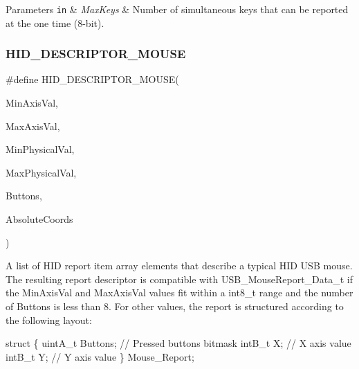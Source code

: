 \begin{DoxyParams}[1]{Parameters}
\mbox{\tt in}  & {\em Max\+Keys} & Number of simultaneous keys that can be reported at the one time (8-\/bit). \\
\hline
\end{DoxyParams}
\mbox{\label{group__Group__USBClassHIDCommon_ga9094a4f76840f1ef8d688cd729935d47}} 
\subsubsection{\texorpdfstring{H\+I\+D\+\_\+\+D\+E\+S\+C\+R\+I\+P\+T\+O\+R\+\_\+\+M\+O\+U\+SE}{HID\_DESCRIPTOR\_MOUSE}}
{\footnotesize\ttfamily \#define H\+I\+D\+\_\+\+D\+E\+S\+C\+R\+I\+P\+T\+O\+R\+\_\+\+M\+O\+U\+SE(\begin{DoxyParamCaption}\item[{}]{Min\+Axis\+Val,  }\item[{}]{Max\+Axis\+Val,  }\item[{}]{Min\+Physical\+Val,  }\item[{}]{Max\+Physical\+Val,  }\item[{}]{Buttons,  }\item[{}]{Absolute\+Coords }\end{DoxyParamCaption})}

A list of H\+ID report item array elements that describe a typical H\+ID U\+SB mouse. The resulting report descriptor is compatible with U\+S\+B\+\_\+\+Mouse\+Report\+\_\+\+Data\+\_\+t if the {\ttfamily Min\+Axis\+Val} and {\ttfamily Max\+Axis\+Val} values fit within a {\ttfamily int8\+\_\+t} range and the number of Buttons is less than 8. For other values, the report is structured according to the following layout\+:


\begin{DoxyCode}
\textcolor{keyword}{struct}
\{
    uintA\_t Buttons; \textcolor{comment}{// Pressed buttons bitmask}
    intB\_t X; \textcolor{comment}{// X axis value}
    intB\_t Y; \textcolor{comment}{// Y axis value}
\} Mouse\_Report;
\end{DoxyCode}


